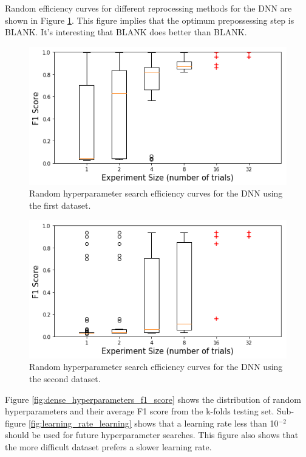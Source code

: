 Random efficiency curves for different reprocessing methods for the DNN are shown in Figure \ref{fig:random_hp_search_dnn_easy}. This figure implies that the optimum prepossessing step is BLANK. It's interesting that BLANK does better than BLANK.

\begin{figure}[H]
	\centering
	\includegraphics[width=0.8\linewidth]{images/random_hp_search_dnn_easy}
	\caption{Random hyperparameter search efficiency curves for the DNN using the first dataset.}
	\label{fig:random_hp_search_dnn_easy}
\end{figure}

\begin{figure}[H]
	\centering
	\includegraphics[width=0.8\linewidth]{images/random_hp_search_dnn_full}
	\caption{Random hyperparameter search efficiency curves for the DNN using the second dataset.}
	\label{fig:random_hp_search_dnn_full}
\end{figure}


Figure \ref{fig:dense_hyperparameters_f1_score} shows the distribution of random hyperparameters and their average F1 score from the k-folds testing set. Sub-figure \ref{fig:learning_rate_learning} shows that a learning rate less than 10$^{-2}$ should be used for future hyperparameter searches. This figure also shows that the more difficult dataset prefers a slower learning rate. 


